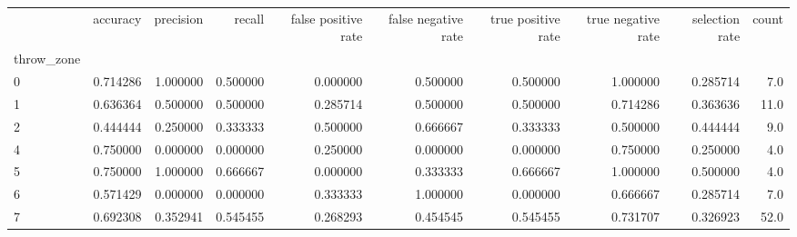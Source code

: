\begin{tabular}{lrrrrrrrrr}
\toprule
{} &  accuracy &  precision &    recall &  false positive rate &  false negative rate &  true positive rate &  true negative rate &  selection rate &  count \\
throw\_zone &           &            &           &                      &                      &                     &                     &                 &        \\
\midrule
0          &  0.714286 &   1.000000 &  0.500000 &             0.000000 &             0.500000 &            0.500000 &            1.000000 &        0.285714 &    7.0 \\
1          &  0.636364 &   0.500000 &  0.500000 &             0.285714 &             0.500000 &            0.500000 &            0.714286 &        0.363636 &   11.0 \\
2          &  0.444444 &   0.250000 &  0.333333 &             0.500000 &             0.666667 &            0.333333 &            0.500000 &        0.444444 &    9.0 \\
4          &  0.750000 &   0.000000 &  0.000000 &             0.250000 &             0.000000 &            0.000000 &            0.750000 &        0.250000 &    4.0 \\
5          &  0.750000 &   1.000000 &  0.666667 &             0.000000 &             0.333333 &            0.666667 &            1.000000 &        0.500000 &    4.0 \\
6          &  0.571429 &   0.000000 &  0.000000 &             0.333333 &             1.000000 &            0.000000 &            0.666667 &        0.285714 &    7.0 \\
7          &  0.692308 &   0.352941 &  0.545455 &             0.268293 &             0.454545 &            0.545455 &            0.731707 &        0.326923 &   52.0 \\
\bottomrule
\end{tabular}
